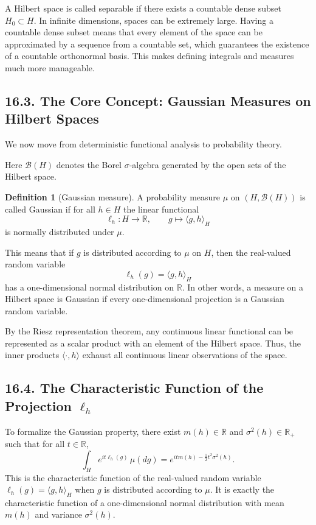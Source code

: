 \documentclass[11pt]{article}
\theoremstyle{definition}
\newtheorem{definition}{Definition}
\theoremstyle{remark}
\begin{document}
A Hilbert space is called separable if there exists a countable dense subset $H_0\subset H$. In infinite dimensions, spaces can be extremely large. Having a countable dense subset means that every element of the space can be approximated by a sequence from a countable set, which guarantees the existence of a countable orthonormal basis. This makes defining integrals and measures much more manageable.

\subsection*{16.3. The Core Concept: Gaussian Measures on Hilbert Spaces}
We now move from deterministic functional analysis to probability theory.

Here $\mathcal B(H)$ denotes the Borel $\sigma$-algebra generated by the open sets of the Hilbert space.

\begin{definition}[Gaussian measure]
A probability measure $\mu$ on $(H,\mathcal B(H))$ is called Gaussian if for all $h\in H$ the linear functional
\[
\ell_h:H\to\mathbb R,\qquad g\mapsto \langle g,h\rangle_H
\]
is normally distributed under $\mu$.
\end{definition}

This means that if $g$ is distributed according to $\mu$ on $H$, then the real-valued random variable
\[
\ell_h(g)=\langle g,h\rangle_H
\]
has a one-dimensional normal distribution on $\mathbb R$. In other words, a measure on a Hilbert space is Gaussian if every one-dimensional projection is a Gaussian random variable.

By the Riesz representation theorem, any continuous linear functional can be represented as a scalar product with an element of the Hilbert space. Thus, the inner products $\langle \cdot,h\rangle$ exhaust all continuous linear observations of the space.

\subsection*{16.4. The Characteristic Function of the Projection $\ell_h$}
To formalize the Gaussian property, there exist $m(h)\in\mathbb R$ and $\sigma^2(h)\in\mathbb R_+$ such that for all $t\in\mathbb R$,
\[
\int_H e^{it\ell_h(g)}\,\mu(dg)=e^{itm(h)-\frac12 t^2\sigma^2(h)}.
\]
This is the characteristic function of the real-valued random variable $\ell_h(g)=\langle g,h\rangle_H$ when $g$ is distributed according to $\mu$. It is exactly the characteristic function of a one-dimensional normal distribution with mean $m(h)$ and variance $\sigma^2(h)$.
\end{document}
